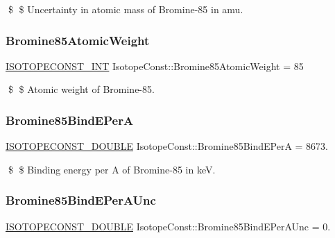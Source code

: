 \$ \$ Uncertainty in atomic mass of Bromine-\/85 in amu. \mbox{\label{group___isotope_const-_bromine-_br85_gad82633eb72aa6e3c50b2471961e1e658}} 
\subsubsection{\texorpdfstring{Bromine85\+Atomic\+Weight}{Bromine85AtomicWeight}}
{\footnotesize\ttfamily \mbox{\hyperlink{group___isotope_const-_macros_ga5f18360b3e99483a35c32d789e62621c}{I\+S\+O\+T\+O\+P\+E\+C\+O\+N\+S\+T\+\_\+\+I\+NT}} Isotope\+Const\+::\+Bromine85\+Atomic\+Weight = 85}

\$ \$ Atomic weight of Bromine-\/85. \mbox{\label{group___isotope_const-_bromine-_br85_gaf4c6b8af1a046fde5432cba6e7e84a5d}} 
\subsubsection{\texorpdfstring{Bromine85\+Bind\+E\+PerA}{Bromine85BindEPerA}}
{\footnotesize\ttfamily \mbox{\hyperlink{group___isotope_const-_macros_ga8f45a7272ce02c0b4c65c44636ed719a}{I\+S\+O\+T\+O\+P\+E\+C\+O\+N\+S\+T\+\_\+\+D\+O\+U\+B\+LE}} Isotope\+Const\+::\+Bromine85\+Bind\+E\+PerA = 8673.}

\$ \$ Binding energy per A of Bromine-\/85 in keV. \mbox{\label{group___isotope_const-_bromine-_br85_ga05bce81583d59f0a023d331b0728d411}} 
\subsubsection{\texorpdfstring{Bromine85\+Bind\+E\+Per\+A\+Unc}{Bromine85BindEPerAUnc}}
{\footnotesize\ttfamily \mbox{\hyperlink{group___isotope_const-_macros_ga8f45a7272ce02c0b4c65c44636ed719a}{I\+S\+O\+T\+O\+P\+E\+C\+O\+N\+S\+T\+\_\+\+D\+O\+U\+B\+LE}} Isotope\+Const\+::\+Bromine85\+Bind\+E\+Per\+A\+Unc = 0.}

